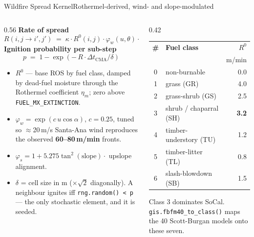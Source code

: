\documentclass[aspectratio=169,9pt]{beamer}
\newcommand{\code}[1]{{\small\texttt{#1}}}
\newcommand{\gold}[1]{{\color{cslaeaglegold}\textbf{#1}}}
\begin{document}
\begin{frame}{Wildfire Spread Kernel}{Rothermel-derived, wind- and slope-modulated}
  \begin{columns}[T,onlytextwidth]
    \begin{column}{0.56\textwidth}
      \textbf{Rate of spread}
      \[
        R(i,j \to i',j') \;=\; \kappa \cdot R^{0}(i,j)
          \cdot \varphi_w(u,\theta) \cdot \varphi_s(z,\theta)
      \]
      \textbf{Ignition probability per sub-step}
      \[
        p \;=\; 1 - \exp\!\left(-\,R \cdot \Delta t_{\mathrm{CMA}} / \delta\right)
      \]
      \small
      \begin{itemize}
        \item $R^{0}$ --- base ROS by fuel class, damped by dead-fuel
              moisture through the Rothermel coefficient $\eta_m$; zero
              above \code{FUEL\_MX\_EXTINCTION}.
        \item $\varphi_w = \exp(c\,u\cos\alpha)$, $c=0.25$, tuned so
              $\approx$20\,m/s Santa-Ana wind reproduces the observed
              \gold{60--80\,m/min} fronts.
        \item $\varphi_s = 1 + 5.275\tan^{2}(\text{slope})\cdot$ upslope
              alignment.
        \item $\delta$ = cell size in m ($\times\sqrt{2}$ diagonally).
              A neighbour ignites iff \code{rng.random() < p} --- the only
              stochastic element, and it is seeded.
      \end{itemize}
    \end{column}
    \begin{column}{0.42\textwidth}
      \centering\small
      \begin{tabular}{@{}c l r@{}}
        \toprule
        \textbf{\#} & \textbf{Fuel class} & \textbf{$R^{0}$}\\
                    &                     & {\scriptsize m/min}\\
        \midrule
        0 & non-burnable        & 0.0\\
        1 & grass (GR)          & 4.0\\
        2 & grass-shrub (GS)    & 2.5\\
        3 & shrub / chaparral (SH) & \textbf{3.2}\\
        4 & timber-understory (TU) & 1.2\\
        5 & timber-litter (TL)  & 0.8\\
        6 & slash-blowdown (SB) & 1.5\\
        \bottomrule
      \end{tabular}
      \vskip4pt
      {\scriptsize\color{csladarkgray}Class 3 dominates SoCal.
       \texttt{gis.fbfm40\_to\_class()} maps the 40 Scott-Burgan models
       onto these seven.}
    \end{column}
  \end{columns}
\end{frame}
\end{document}
